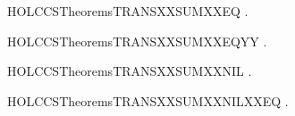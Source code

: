 \newcommand{\HOLCCSTheoremsTRANSXXSUM}{\UseVerbatim{HOLCCSTheoremsTRANSXXSUM}}
\begin{SaveVerbatim}{HOLCCSTheoremsTRANSXXSUMXXEQ}
\HOLTokenTurnstile{} \HOLSymConst{\HOLTokenForall{}}   .  \HOLSymConst{+}  \HOLTokenTransBegin{}\HOLTokenTransEnd {} \HOLSymConst{\HOLTokenEquiv{}}  \HOLTokenTransBegin{}\HOLTokenTransEnd {} \HOLSymConst{\HOLTokenDisj{}}  \HOLTokenTransBegin{}\HOLTokenTransEnd {}
\end{SaveVerbatim}
\newcommand{\HOLCCSTheoremsTRANSXXSUMXXEQ}{\UseVerbatim{HOLCCSTheoremsTRANSXXSUMXXEQ}}
\begin{SaveVerbatim}{HOLCCSTheoremsTRANSXXSUMXXEQYY}
\HOLTokenTurnstile{} \HOLSymConst{\HOLTokenForall{}}   .  \HOLSymConst{+}  \HOLTokenTransBegin{}\HOLTokenTransEnd {} \HOLSymConst{\HOLTokenEquiv{}}  \HOLTokenTransBegin{}\HOLTokenTransEnd {} \HOLSymConst{\HOLTokenDisj{}}  \HOLTokenTransBegin{}\HOLTokenTransEnd {}
\end{SaveVerbatim}
\newcommand{\HOLCCSTheoremsTRANSXXSUMXXEQYY}{\UseVerbatim{HOLCCSTheoremsTRANSXXSUMXXEQYY}}
\begin{SaveVerbatim}{HOLCCSTheoremsTRANSXXSUMXXNIL}
\HOLTokenTurnstile{} \HOLSymConst{\HOLTokenForall{}}  .  \HOLSymConst{+}  \HOLTokenTransBegin{}\HOLTokenTransEnd {} \HOLSymConst{\HOLTokenImp{}}  \HOLTokenTransBegin{}\HOLTokenTransEnd {}
\end{SaveVerbatim}
\newcommand{\HOLCCSTheoremsTRANSXXSUMXXNIL}{\UseVerbatim{HOLCCSTheoremsTRANSXXSUMXXNIL}}
\begin{SaveVerbatim}{HOLCCSTheoremsTRANSXXSUMXXNILXXEQ}
\HOLTokenTurnstile{} \HOLSymConst{\HOLTokenForall{}}  .  \HOLSymConst{+}  \HOLTokenTransBegin{}\HOLTokenTransEnd {} \HOLSymConst{\HOLTokenEquiv{}}  \HOLTokenTransBegin{}\HOLTokenTransEnd {}
\end{SaveVerbatim}
